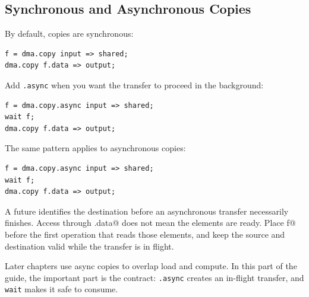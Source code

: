 \subsection*{Synchronous and Asynchronous Copies}

By default, copies are synchronous:

\begin{lstlisting}[language=croqtile,caption={A synchronous copy}]
f = dma.copy input => shared;
dma.copy f.data => output;
\end{lstlisting}

Add \texttt{.async} when you want the transfer to proceed in the background:

\begin{lstlisting}[language=croqtile,caption={An asynchronous copy}]
f = dma.copy.async input => shared;
wait f;
dma.copy f.data => output;
\end{lstlisting}

The same pattern applies to asynchronous copies:

\begin{lstlisting}[language=croqtile,caption={An asynchronous copy}]
f = dma.copy.async input => shared;
wait f;
dma.copy f.data => output;
\end{lstlisting}

A future identifies the destination before an asynchronous transfer necessarily finishes. Access through \co@f.data@ does not mean the elements are ready. Place \co@wait f@ before the first operation that reads those elements, and keep the source and destination valid while the transfer is in flight.

Later chapters use async copies to overlap load and compute. In this part of the guide, the important part is the contract: \texttt{.async} creates an in-flight transfer, and \texttt{wait} makes it safe to consume.
